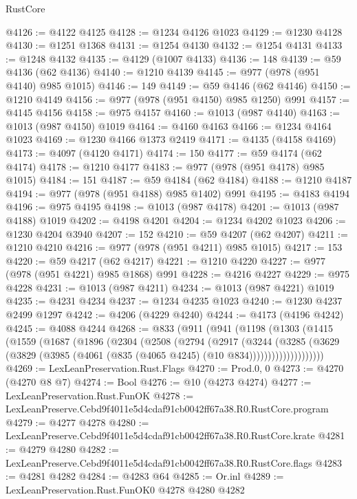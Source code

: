 \begin{lexlean}{RustCore}
\begin{coremodule}
@4126 := @4122 @4125
@4128 := @1234 @4126 @1023
@4129 := @1230 @4128
@4130 := @1251 @1368
@4131 := @1254 @4130
@4132 := @1254 @4131
@4133 := @1248 @4132
@4135 := @4129 (@1007 @4133)
@4136 := 148
@4139 := @59 @4136 (@62 @4136)
@4140 := @1210 @4139
@4145 := @977 (@978 (@951 @4140) @985 @1015)
@4146 := 149
@4149 := @59 @4146 (@62 @4146)
@4150 := @1210 @4149
@4156 := @977 (@978 (@951 @4150) @985 @1250) @991
@4157 := @4145 @4156
@4158 := @975 @4157
@4160 := @1013 (@987 @4140)
@4163 := @1013 (@987 @4150) @1019
@4164 := @4160 @4163
@4166 := @1234 @4164 @1023
@4169 := @1230 @4166 @1373 @2419
@4171 := @4135 (@4158 @4169)
@4173 := @4097 (@4120 @4171)
@4174 := 150
@4177 := @59 @4174 (@62 @4174)
@4178 := @1210 @4177
@4183 := @977 (@978 (@951 @4178) @985 @1015)
@4184 := 151
@4187 := @59 @4184 (@62 @4184)
@4188 := @1210 @4187
@4194 := @977 (@978 (@951 @4188) @985 @1402) @991
@4195 := @4183 @4194
@4196 := @975 @4195
@4198 := @1013 (@987 @4178)
@4201 := @1013 (@987 @4188) @1019
@4202 := @4198 @4201
@4204 := @1234 @4202 @1023
@4206 := @1230 @4204 @3940
@4207 := 152
@4210 := @59 @4207 (@62 @4207)
@4211 := @1210 @4210
@4216 := @977 (@978 (@951 @4211) @985 @1015)
@4217 := 153
@4220 := @59 @4217 (@62 @4217)
@4221 := @1210 @4220
@4227 := @977 (@978 (@951 @4221) @985 @1868) @991
@4228 := @4216 @4227
@4229 := @975 @4228
@4231 := @1013 (@987 @4211)
@4234 := @1013 (@987 @4221) @1019
@4235 := @4231 @4234
@4237 := @1234 @4235 @1023
@4240 := @1230 @4237 @2499 @1297
@4242 := @4206 (@4229 @4240)
@4244 := @4173 (@4196 @4242)
@4245 := @4088 @4244
@4268 := @833
    (@911
      (@941
        (@1198
          (@1303
            (@1415
              (@1559
                (@1687
                  (@1896
                    (@2304
                      (@2508
                        (@2794
                          (@2917
                            (@3244
                              (@3285
                                (@3629
                                  (@3829
                                    (@3985 (@4061 (@835 (@4065 @4245) (@10 @834))))))))))))))))))))
@4269 := LexLeanPreservation.Rust.Flags
@4270 := Prod.{0, 0}
@4273 := @4270 (@4270 @8 @7)
@4274 := Bool
@4276 := @10 (@4273 @4274)
@4277 := LexLeanPreservation.Rust.FunOK
@4278 := LexLeanPreserve.Cebd9f4011e5d4cdaf91cb0042ff67a38.R0.RustCore.program
@4279 := @4277 @4278
@4280 := LexLeanPreserve.Cebd9f4011e5d4cdaf91cb0042ff67a38.R0.RustCore.krate
@4281 := @4279 @4280
@4282 := LexLeanPreserve.Cebd9f4011e5d4cdaf91cb0042ff67a38.R0.RustCore.flags
@4283 := @4281 @4282
@4284 := @4283 @64
@4285 := Or.inl
@4289 := LexLeanPreservation.Rust.FunOK0 @4278 @4280 @4282

\end{coremodule}
\end{lexlean}
